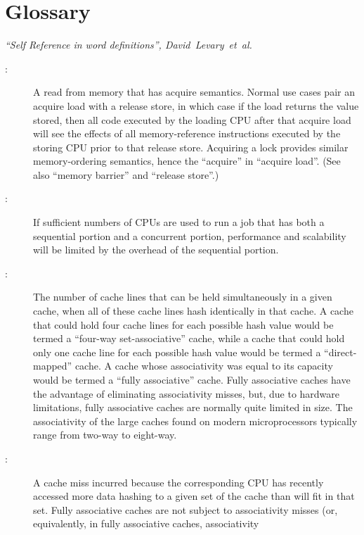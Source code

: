 
\chapter{Glossary}
%
	 {\emph{``Self Reference in word definitions'',
	        David~Levary~et~al.}}

\begin{description}
\item[:]
	A read from memory that has acquire semantics.
	Normal use cases pair an acquire load with a release store,
	in which case if the load returns the value stored, then all
	code executed by the loading CPU after that acquire load will
	see the effects of all memory-reference instructions executed
	by the storing CPU prior to that release store.
	Acquiring a lock provides similar memory-ordering semantics,
	hence the ``acquire'' in ``acquire load''.
	(See also ``memory barrier'' and ``release store''.)
\item[:]
	If sufficient numbers of CPUs are used to run a job that has both
	a sequential portion and a concurrent portion, performance and
	scalability will be limited by the overhead of the sequential
	portion.
\item[:]
	The number of cache lines that can be held simultaneously in
	a given cache, when all of these cache lines hash identically
	in that cache.
	A cache that could hold four cache lines for each possible
	hash value would be termed a ``four-way set-associative'' cache,
	while a cache that could hold only one cache line for each
	possible hash value would be termed a ``direct-mapped'' cache.
	A cache whose associativity was equal to its capacity would
	be termed a ``fully associative'' cache.
	Fully associative caches have the advantage of eliminating
	associativity misses, but, due to hardware limitations,
	fully associative caches are normally quite limited in size.
	The associativity of the large caches found on modern microprocessors
	typically range from two-way to eight-way.
\item[:]
	A cache miss incurred because the corresponding CPU has recently
	accessed more data hashing to a given set of the cache than will
	fit in that set.
	Fully associative caches are not subject to associativity misses
	(or, equivalently, in fully associative caches, associativity

\end{description}

